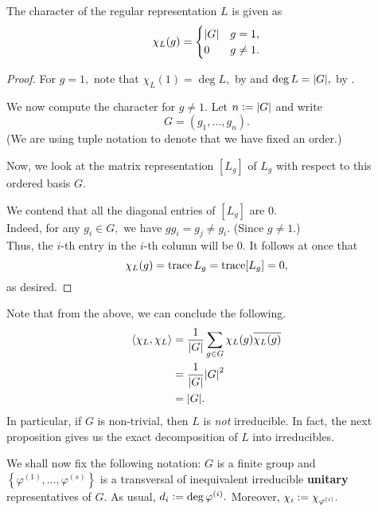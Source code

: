 \begin{prop} \label{prop:charofregrep}
	The character of the regular representation $L$ is given as
	\begin{equation*} 
		\chi_L(g) = \begin{cases}
			{\left\lvert G \right\lvert} & g = 1,\\
			0 & g \neq 1.
		\end{cases}
	\end{equation*}
\end{prop}
\begin{proof} 
	For $g = 1,$ note that $\chi_L(1) = \deg L,$ by  and $\deg L = {\left\lvert G \right\lvert},$ by .

	We now compute the character for $g \neq 1.$ Let $n \vcentcolon= {\left\lvert G \right\lvert}$ and write
	\begin{equation*} 
		G = (g_1, \ldots, g_n).
	\end{equation*}
	(We are using tuple notation to denote that we have fixed an order.) 

	Now, we look at the matrix representation $[L_g]$ of $L_g$ with respect to this ordered basis $G.$

	We contend that all the diagonal entries of $[L_g]$ are $0.$\\
	Indeed, for any $g_i \in G,$ we have $gg_i = g_j \neq g_i.$ (Since $g \neq 1.$) \\
	Thus, the $i$-th entry in the $i$-th column will be $0.$ It follows at once that 
	\begin{equation*} 
		\chi_L(g) = \operatorname{trace} L_g = \operatorname{trace} [L_g] = 0,
	\end{equation*} 
	as desired.
\end{proof}

\begin{rem}
	Note that from the above, we can conclude the following.
	\begin{align*} 
		\langle \chi_L, \chi_L\rangle &= \frac{1}{{\left\lvert G \right\lvert}}\sum_{g \in G} \chi_L(g)\overline{\chi_L(g)}\\
		&= \dfrac{1}{{\left\lvert G \right\lvert}}{\left\lvert G \right\lvert}^2\\
		&= {\left\lvert G \right\lvert}.
	\end{align*}
	In particular, if $G$ is non-trivial, then $L$ is \emph{not} irreducible. In fact, the next proposition gives us the exact decomposition of $L$ into irreducibles.
\end{rem}

We shall now fix the following notation: $G$ is a finite group and $\left\{\varphi^{(1)}, \ldots, \varphi^{(s)}\right\}$ is a transversal of inequivalent irreducible \textbf{unitary} representatives of $G.$ As usual, $d_i \vcentcolon= \deg \varphi^{(i)}.$ Moreover, $\chi_i \vcentcolon= \chi_{\varphi^{(i)}}.$

